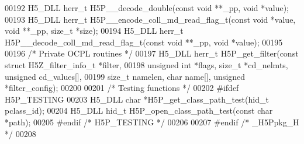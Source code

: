 \begin{DoxyCode}
00192 H5\_DLL herr\_t H5P\_\_decode\_double(\textcolor{keyword}{const} \textcolor{keywordtype}{void} **\_pp, \textcolor{keywordtype}{void} *value);
00193 H5\_DLL herr\_t H5P\_\_encode\_coll\_md\_read\_flag\_t(\textcolor{keyword}{const} \textcolor{keywordtype}{void} *value, \textcolor{keywordtype}{void} **\_pp, \textcolor{keywordtype}{size\_t} *size);
00194 H5\_DLL herr\_t H5P\_\_decode\_coll\_md\_read\_flag\_t(\textcolor{keyword}{const} \textcolor{keywordtype}{void} **\_pp, \textcolor{keywordtype}{void} *value);
00195 
00196 \textcolor{comment}{/* Private OCPL routines */}
00197 H5\_DLL herr\_t H5P\_get\_filter(\textcolor{keyword}{const} \textcolor{keyword}{struct} H5Z\_filter\_info\_t *filter,
00198     \textcolor{keywordtype}{unsigned} \textcolor{keywordtype}{int} *flags, \textcolor{keywordtype}{size\_t} *cd\_nelmts, \textcolor{keywordtype}{unsigned} cd\_values[],
00199     \textcolor{keywordtype}{size\_t} namelen, \textcolor{keywordtype}{char} name[], \textcolor{keywordtype}{unsigned} *filter\_config);
00200 
00201 \textcolor{comment}{/* Testing functions */}
00202 \textcolor{preprocessor}{#ifdef H5P\_TESTING}
00203 H5\_DLL \textcolor{keywordtype}{char} *H5P\_get\_class\_path\_test(hid\_t pclass\_id);
00204 H5\_DLL hid\_t H5P\_open\_class\_path\_test(\textcolor{keyword}{const} \textcolor{keywordtype}{char} *path);
00205 \textcolor{preprocessor}{#endif }\textcolor{comment}{/* H5P\_TESTING */}\textcolor{preprocessor}{}
00206 
00207 \textcolor{preprocessor}{#endif }\textcolor{comment}{/* \_H5Ppkg\_H */}\textcolor{preprocessor}{}
00208 
\end{DoxyCode}
